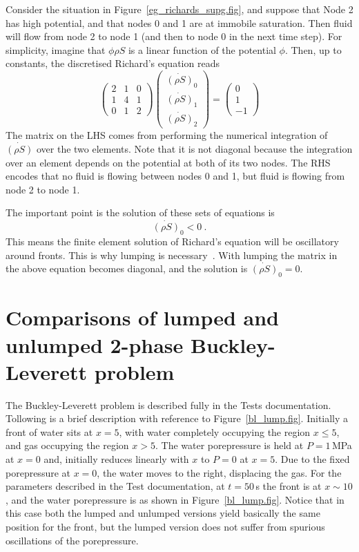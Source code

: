 \documentclass[]{scrreprt}
\begin{document}
Consider the situation in Figure~\ref{eg_richards_supg.fig}, and
suppose that Node 2 has high potential, and that nodes 0 and 1 are at
immobile saturation.  Then fluid will flow from node 2 to node 1 (and
then to node 0 in the next time step).  For simplicity, imagine that
$\phi\rho S$ is a linear
function of the potential $\phi$.  Then, up to constants, the
discretised Richard's equation reads
\begin{equation}
\left(
\begin{array}{ccc}
2 & 1 & 0 \\
1 & 4 & 1 \\
0 & 1 & 2
\end{array}
\right)
\left(
\begin{array}{c}
\dot{(\rho S)}_{0} \\
\dot{(\rho S)}_{1} \\
\dot{(\rho S)}_{2}
\end{array}
\right)
=
\left(
\begin{array}{c}
0 \\
1 \\
-1
\end{array}
\right)
\end{equation}
The matrix on the LHS comes from performing the numerical integration
of $\dot{(\rho S)}$ over the two elements.  Note that it is not diagonal
because the integration over an element depends on the potential at
both of its two nodes.  The RHS encodes that no fluid is flowing
between nodes 0 and 1, but fluid is flowing from node 2 to node 1.

The important point is the solution of these sets of equations is
\begin{equation}
\dot{(\rho S)}_{0} < 0 \ .
\end{equation}
This means the finite element solution of Richard's equation will be
oscillatory around fronts.  This is why lumping is
necessary~\cite{celiaET1990}.  With lumping the matrix in the above
equation becomes diagonal, and the solution is $\dot{(\rho S)}_{0} =
0$.

\section{Comparisons of lumped and unlumped 2-phase Buckley-Leverett problem}

The Buckley-Leverett problem is described fully in the Tests
documentation.  Tollowing is a brief description with reference to
Figure~\ref{bl_lump.fig}.  Initially a front of water sits at $x=5$,
with water completely occupying the region $x\leq 5$, and gas
occupying the region $x>5$.  The water porepressure is held at
$P=1$\,MPa at $x=0$ and, initially reduces linearly with $x$ to $P=0$
at $x=5$.  Due to the fixed porepressure at $x=0$, the water moves to
the right, displacing the gas.  For the parameters described in the
Test documentation, at $t=50$\,s the front is at $x\sim 10$, and the
water porepressure is as shown in Figure~\ref{bl_lump.fig}.  Notice
that in this case both the lumped and unlumped versions yield
basically the same position for the front, but the lumped version does
not suffer from spurious oscillations of the porepressure.
\end{document}
